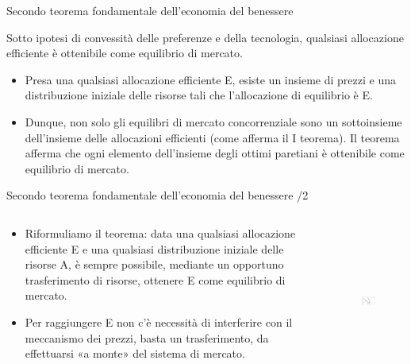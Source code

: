 \documentclass[aspectratio=64,12pt]{beamer}
\begin{document}
\begin{frame}{Secondo teorema fondamentale dell'economia del benessere}
\begin{block}{}
Sotto ipotesi di convessità delle preferenze e della tecnologia, qualsiasi allocazione efficiente è ottenibile come equilibrio di mercato. 
\end{block}
\begin{itemize}
\item Presa una qualsiasi allocazione efficiente E, esiste un insieme di prezzi e
una distribuzione iniziale delle risorse tali che l’allocazione di
equilibrio è E.
\item Dunque, non solo gli equilibri di mercato concorrenziale sono un
sottoinsieme dell’insieme delle allocazioni efficienti (come afferma il I
teorema). Il teorema afferma che ogni elemento dell’insieme degli
ottimi paretiani è ottenibile come equilibrio di mercato.
\end{itemize}
\end{frame}


\begin{frame}{Secondo teorema fondamentale dell'economia del benessere /2}
\begin{columns}
\begin{column}{.45\columnwidth}
\begin{itemize}
\item Riformuliamo il teorema: data una qualsiasi allocazione efficiente E e una qualsiasi distribuzione iniziale delle risorse A, è sempre possibile, mediante un opportuno trasferimento di risorse, ottenere E come equilibrio di mercato.
\item Per raggiungere E non c’è necessità di interferire con il meccanismo dei prezzi, basta un trasferimento, da effettuarsi «a monte» del sistema di mercato.
\end{itemize}
\end{column}

\begin{column}{.55\columnwidth}
\begin{figure}
\centering
\includegraphics[height=5cm]{./figure/edgeworth-6.pdf}
\end{figure}
\end{column}
\end{columns}
\end{frame}
\end{document}
